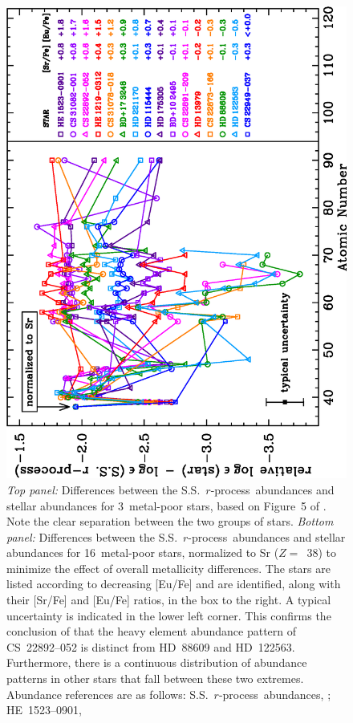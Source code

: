 \documentclass{emulateapj}
\def\rpro{\mbox{$r$-process}}
\begin{document}
\begin{figure}
\begin{center}
\includegraphics[angle=270,width=4.5in]{f11b.eps}
\end{center}
\clearpage
\caption{
\label{rprostars1}
\scriptsize
\textit{Top panel:} 
Differences between the S.S.\ \rpro\ abundances and
stellar abundances for 3~metal-poor stars, based on Figure~5 
of \citet{honda07}.
Note the clear separation between the two groups of stars.
\textit{Bottom panel:}
Differences between the S.S.\ \rpro\ abundances and
stellar abundances for 16~metal-poor stars, normalized to 
Sr ($Z =$~38) to minimize the effect of overall metallicity differences.
The stars are listed according to decreasing [Eu/Fe] and are
identified, along with their
[Sr/Fe] and [Eu/Fe] ratios, in the box to the right.
A typical uncertainty is indicated in the lower left corner.
This confirms the conclusion of \citet{honda07} that the
heavy element abundance pattern of \mbox{CS~22892--052} is
distinct from \mbox{HD~88609} and \mbox{HD~122563}.
Furthermore, there is a continuous distribution of 
abundance patterns in other stars that fall between these two extremes.
Abundance references are as follows:
S.S.\ \rpro\ abundances, \citet{sneden08};
\mbox{HE~1523--0901}, \citet{frebel07} 
}
\end{figure}
\end{document}

